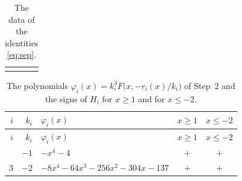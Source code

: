 \documentclass[11pt]{article}
\begin{document}
\begingroup\footnotesize
\setlength{\LTcapwidth}{\textwidth}
\begin{longtable}{@{}ll@{}}
\caption{The data of the identities \eqref{eq:sep}.}\label{tab:sep}\\
\hline\endfirsthead\hline\endhead\hline\endfoot
\end{longtable}
\endgroup

\begingroup\footnotesize
\setlength{\LTcapwidth}{\textwidth}
\begin{longtable}{@{}rrlcc@{}}
\caption{The polynomials $\varphi_i(x)=k_i^3F\bigl(x,-r_i(x)/k_i\bigr)$ of Step~2 and the signs of $H_i$ for $x\geq1$ and for $x\leq-2$.}\label{tab:phi}\\
\hline $i$ & $k_i$ & $\varphi_i(x)$ & $x\geq1$ & $x\leq-2$\\\hline\endfirsthead\hline $i$ & $k_i$ & $\varphi_i(x)$ & $x\geq1$ & $x\leq-2$\\\hline\endhead\hline\endfoot
0 & $-1$ & $-x^{4}-4$ & $+$ & $+$\\
3 & $-2$ & $-8x^{4}-64x^{3}-256x^{2}-304x-137$ & $+$ & $+$\\
\end{longtable}
\endgroup
\end{document}
